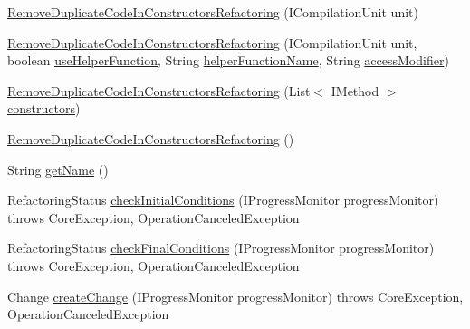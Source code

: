 \begin{DoxyCompactItemize}
\item 
\hyperlink{classedu_1_1illinois_1_1canistelCassabanana_1_1RemoveDuplicateCodeInConstructorsRefactoring_a5ff873e3fba88513f81c2c3fe23cf51a}{RemoveDuplicateCodeInConstructorsRefactoring} (ICompilationUnit unit)
\item 
\hyperlink{classedu_1_1illinois_1_1canistelCassabanana_1_1RemoveDuplicateCodeInConstructorsRefactoring_aead22531a9c1d9c518504abab386871b}{RemoveDuplicateCodeInConstructorsRefactoring} (ICompilationUnit unit, boolean \hyperlink{classedu_1_1illinois_1_1canistelCassabanana_1_1RemoveDuplicateCodeInConstructorsRefactoring_ac3d10235e0a51b7d76e5a34233a842ae}{useHelperFunction}, String \hyperlink{classedu_1_1illinois_1_1canistelCassabanana_1_1RemoveDuplicateCodeInConstructorsRefactoring_aeec592ffa5b5903205515925d84c2bb8}{helperFunctionName}, String \hyperlink{classedu_1_1illinois_1_1canistelCassabanana_1_1RemoveDuplicateCodeInConstructorsRefactoring_ac98e605acbaebe4c90d19de7baae3798}{accessModifier})
\item 
\hyperlink{classedu_1_1illinois_1_1canistelCassabanana_1_1RemoveDuplicateCodeInConstructorsRefactoring_a7eedf12b934fab81ef08d119179b2392}{RemoveDuplicateCodeInConstructorsRefactoring} (List$<$ IMethod $>$ \hyperlink{classedu_1_1illinois_1_1canistelCassabanana_1_1RemoveDuplicateCodeInConstructorsRefactoring_a9d31c4c2b04e3ed5a8450714a08f1381}{constructors})
\item 
\hyperlink{classedu_1_1illinois_1_1canistelCassabanana_1_1RemoveDuplicateCodeInConstructorsRefactoring_aebc7814b847d4d25f8ba6121b814b26d}{RemoveDuplicateCodeInConstructorsRefactoring} ()
\item 
String \hyperlink{classedu_1_1illinois_1_1canistelCassabanana_1_1RemoveDuplicateCodeInConstructorsRefactoring_a37547064d6f23ee40520d75163f9b72a}{getName} ()
\item 
RefactoringStatus \hyperlink{classedu_1_1illinois_1_1canistelCassabanana_1_1RemoveDuplicateCodeInConstructorsRefactoring_aa580002594ce1e30688c69ecf4cc9997}{checkInitialConditions} (IProgressMonitor progressMonitor)  throws CoreException, 			OperationCanceledException 
\item 
RefactoringStatus \hyperlink{classedu_1_1illinois_1_1canistelCassabanana_1_1RemoveDuplicateCodeInConstructorsRefactoring_aea338e1a0b659532042e5d36ad52aa00}{checkFinalConditions} (IProgressMonitor progressMonitor)  throws CoreException, 			OperationCanceledException 
\item 
Change \hyperlink{classedu_1_1illinois_1_1canistelCassabanana_1_1RemoveDuplicateCodeInConstructorsRefactoring_a903da4ed01d98cf13d3b1713dad531e3}{createChange} (IProgressMonitor progressMonitor)  throws CoreException, OperationCanceledException 

\end{DoxyCompactItemize}
